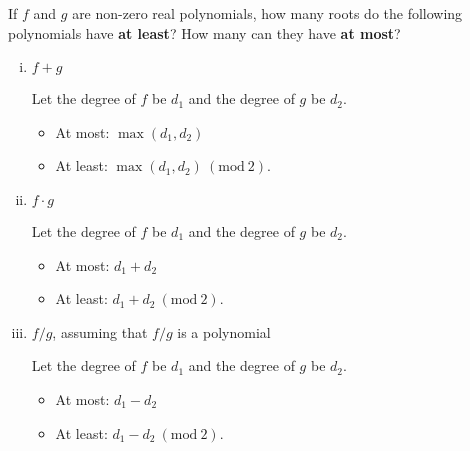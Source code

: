 \documentclass[11pt]{article}
\newcommand{\Mod}[1]{\ (\mathrm{mod}\ #1)}
\begin{document}
\begin{Parts}
    \Part If $f$ and $g$ are non-zero real polynomials, how many roots do the following 
    polynomials have \textbf{at least}? How many can they have \textbf{at most}? 
    \begin{enumerate}[(i)]
        \item $f + g$
        \begin{Answer}
            Let the degree of $f$ be $d_1$ and the degree of $g$ be $d_2$. 
            \begin{itemize}
                \item At most: $\max(d_1, d_2)$
                \item At least: $\max(d_1, d_2) \Mod{2}$.
            \end{itemize}
        \end{Answer}

        \item $f\cdot g$
        \begin{Answer}
            Let the degree of $f$ be $d_1$ and the degree of $g$ be $d_2$. 
            \begin{itemize}
                \item At most: $d_1 + d_2$
                \item At least: $d_1 + d_2 \Mod{2}$.
            \end{itemize}
        \end{Answer}

        \item $f/g$, assuming that $f/g$ is a polynomial
        \begin{Answer}
            Let the degree of $f$ be $d_1$ and the degree of $g$ be $d_2$. 
            \begin{itemize}
                \item At most: $d_1 - d_2$
                \item At least: $d_1 - d_2 \Mod{2}$.
            \end{itemize}
        \end{Answer}
    \end{enumerate}


\end{Parts}
\end{document}
